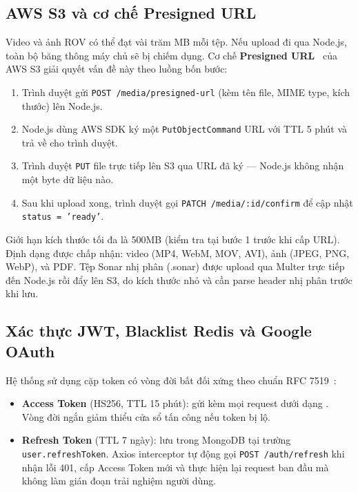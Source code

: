 \documentclass[../DoAn.tex]{subfiles}
\begin{document}
\subsection{AWS S3 và cơ chế Presigned URL}

Video và ảnh ROV có thể đạt vài trăm MB mỗi tệp. Nếu upload đi qua Node.js, toàn bộ băng thông máy chủ sẽ bị chiếm dụng. Cơ chế \textbf{Presigned URL}~\cite{awss3} của AWS S3 giải quyết vấn đề này theo luồng bốn bước:

\begin{enumerate}[leftmargin=*, topsep=4pt, itemsep=2pt]
  \item Trình duyệt gửi \texttt{POST /media/presigned-url} (kèm tên file, MIME type, kích thước) lên Node.js.
  \item Node.js dùng AWS SDK ký một \texttt{PutObjectCommand} URL với TTL 5 phút và trả về cho trình duyệt.
  \item Trình duyệt \texttt{PUT} file trực tiếp lên S3 qua URL đã ký --- Node.js không nhận một byte dữ liệu nào.
  \item Sau khi upload xong, trình duyệt gọi \texttt{PATCH /media/:id/confirm} để cập nhật \texttt{status = 'ready'}.
\end{enumerate}

Giới hạn kích thước tối đa là 500MB (kiểm tra tại bước 1 trước khi cấp URL). Định dạng được chấp nhận: video (MP4, WebM, MOV, AVI), ảnh (JPEG, PNG, WebP), và PDF. Tệp Sonar nhị phân (.sonar) được upload qua Multer trực tiếp đến Node.js rồi đẩy lên S3, do kích thước nhỏ và cần parse header nhị phân trước khi lưu.

\subsection{Xác thực JWT, Blacklist Redis và Google OAuth}

Hệ thống sử dụng cặp token có vòng đời bất đối xứng theo chuẩn RFC 7519~\cite{jwtspec}:

\begin{itemize}[leftmargin=*, topsep=4pt, itemsep=2pt]
  \item \textbf{Access Token} (HS256, TTL 15 phút): gửi kèm mọi request dưới dạng . Vòng đời ngắn giảm thiểu cửa sổ tấn công nếu token bị lộ.
  \item \textbf{Refresh Token} (TTL 7 ngày): lưu trong MongoDB tại trường \texttt{user.refreshToken}. Axios interceptor tự động gọi \texttt{POST /auth/refresh} khi nhận lỗi 401, cấp Access Token mới và thực hiện lại request ban đầu mà không làm gián đoạn trải nghiệm người dùng.
\end{itemize}
\end{document}
